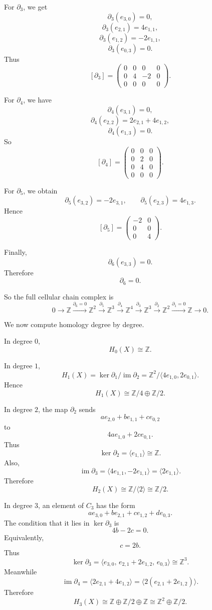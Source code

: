 \documentclass[12pt,a4paper]{article}
\theoremstyle{notespace}
\begin{document}
For \(\partial_3\), we get
\[
\partial_3(e_{3,0})=0,
\]
\[
\partial_3(e_{2,1})=4e_{1,1},
\]
\[
\partial_3(e_{1,2})=-2e_{1,1},
\]
\[
\partial_3(e_{0,3})=0.
\]
Thus
\[
[\partial_3]
=
\begin{pmatrix}
	0 & 0 & 0 & 0\\
	0 & 4 & -2 & 0\\
	0 & 0 & 0 & 0
\end{pmatrix}.
\]

For \(\partial_4\), we have
\[
\partial_4(e_{3,1})=0,
\]
\[
\partial_4(e_{2,2})
=
2e_{2,1}+4e_{1,2},
\]
\[
\partial_4(e_{1,3})=0.
\]
So
\[
[\partial_4]
=
\begin{pmatrix}
	0 & 0 & 0\\
	0 & 2 & 0\\
	0 & 4 & 0\\
	0 & 0 & 0
\end{pmatrix}.
\]

For \(\partial_5\), we obtain
\[
\partial_5(e_{3,2})=-2e_{3,1},
\qquad
\partial_5(e_{2,3})=4e_{1,3}.
\]
Hence
\[
[\partial_5]
=
\begin{pmatrix}
	-2 & 0\\
	0 & 0\\
	0 & 4
\end{pmatrix}.
\]

Finally,
\[
\partial_6(e_{3,3})=0.
\]
Therefore
\[
\partial_6=0.
\]

So the full cellular chain complex is
\[
0
\longrightarrow
\mathbb Z
\xrightarrow{\partial_6=0}
\mathbb Z^2
\xrightarrow{\partial_5}
\mathbb Z^3
\xrightarrow{\partial_4}
\mathbb Z^4
\xrightarrow{\partial_3}
\mathbb Z^3
\xrightarrow{\partial_2}
\mathbb Z^2
\xrightarrow{\partial_1=0}
\mathbb Z
\longrightarrow 0.
\]

We now compute homology degree by degree.

In degree \(0\),
\[
H_0(X)\cong \mathbb Z.
\]

In degree \(1\),
\[
H_1(X)
=
\ker \partial_1/\operatorname{im}\partial_2
=
\mathbb Z^2/\langle 4e_{1,0},2e_{0,1}\rangle.
\]
Hence
\[
H_1(X)\cong \mathbb Z/4\oplus \mathbb Z/2.
\]

In degree \(2\), the map \(\partial_2\) sends
\[
a e_{2,0}+b e_{1,1}+c e_{0,2}
\]
to
\[
4a e_{1,0}+2c e_{0,1}.
\]
Thus
\[
\ker \partial_2=\langle e_{1,1}\rangle\cong \mathbb Z.
\]
Also,
\[
\operatorname{im}\partial_3
=
\langle 4e_{1,1},-2e_{1,1}\rangle
=
\langle 2e_{1,1}\rangle.
\]
Therefore
\[
H_2(X)
\cong
\mathbb Z/\langle 2\rangle
\cong
\mathbb Z/2.
\]

In degree \(3\), an element of \(C_3\) has the form
\[
a e_{3,0}+b e_{2,1}+c e_{1,2}+d e_{0,3}.
\]
The condition that it lies in \(\ker \partial_3\) is
\[
4b-2c=0.
\]
Equivalently,
\[
c=2b.
\]
Thus
\[
\ker \partial_3
=
\langle e_{3,0},\, e_{2,1}+2e_{1,2},\, e_{0,3}\rangle
\cong \mathbb Z^3.
\]
Meanwhile
\[
\operatorname{im}\partial_4
=
\langle 2e_{2,1}+4e_{1,2}\rangle
=
\langle 2(e_{2,1}+2e_{1,2})\rangle.
\]
Therefore
\[
H_3(X)
\cong
\mathbb Z\oplus \mathbb Z/2\oplus \mathbb Z
\cong
\mathbb Z^2\oplus \mathbb Z/2.
\]
\end{document}
